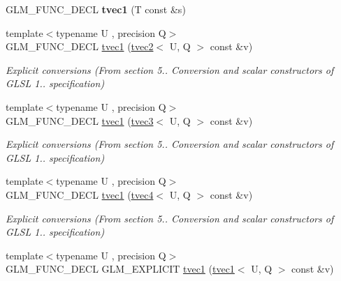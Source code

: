 \begin{DoxyCompactItemize}
\item 
\hypertarget{structglm_1_1tvec1_a601c1ad94434ad4f07eb536e66bd1143}{G\-L\-M\-\_\-\-F\-U\-N\-C\-\_\-\-D\-E\-C\-L {\bfseries tvec1} (T const \&s)}\label{structglm_1_1tvec1_a601c1ad94434ad4f07eb536e66bd1143}

\item 
\hypertarget{structglm_1_1tvec1_a8851910a8c3a76c5af513069af86c5f9}{{\footnotesize template$<$typename U , precision Q$>$ }\\G\-L\-M\-\_\-\-F\-U\-N\-C\-\_\-\-D\-E\-C\-L \hyperlink{structglm_1_1tvec1_a8851910a8c3a76c5af513069af86c5f9}{tvec1} (\hyperlink{structglm_1_1tvec2}{tvec2}$<$ U, Q $>$ const \&v)}\label{structglm_1_1tvec1_a8851910a8c3a76c5af513069af86c5f9}

\begin{DoxyCompactList}\small\item\em Explicit conversions (From section 5.. Conversion and scalar constructors of G\-L\-S\-L 1.. specification) \end{DoxyCompactList}\item 
\hypertarget{structglm_1_1tvec1_a680bd254cdc4777fc964b2bc96be2429}{{\footnotesize template$<$typename U , precision Q$>$ }\\G\-L\-M\-\_\-\-F\-U\-N\-C\-\_\-\-D\-E\-C\-L \hyperlink{structglm_1_1tvec1_a680bd254cdc4777fc964b2bc96be2429}{tvec1} (\hyperlink{structglm_1_1tvec3}{tvec3}$<$ U, Q $>$ const \&v)}\label{structglm_1_1tvec1_a680bd254cdc4777fc964b2bc96be2429}

\begin{DoxyCompactList}\small\item\em Explicit conversions (From section 5.. Conversion and scalar constructors of G\-L\-S\-L 1.. specification) \end{DoxyCompactList}\item 
\hypertarget{structglm_1_1tvec1_ab987fb10b4d96f02fe57a8f27fe009b3}{{\footnotesize template$<$typename U , precision Q$>$ }\\G\-L\-M\-\_\-\-F\-U\-N\-C\-\_\-\-D\-E\-C\-L \hyperlink{structglm_1_1tvec1_ab987fb10b4d96f02fe57a8f27fe009b3}{tvec1} (\hyperlink{structglm_1_1tvec4}{tvec4}$<$ U, Q $>$ const \&v)}\label{structglm_1_1tvec1_ab987fb10b4d96f02fe57a8f27fe009b3}

\begin{DoxyCompactList}\small\item\em Explicit conversions (From section 5.. Conversion and scalar constructors of G\-L\-S\-L 1.. specification) \end{DoxyCompactList}\item 
\hypertarget{structglm_1_1tvec1_a91828fdb1181e3e95e990aaf23b2db46}{{\footnotesize template$<$typename U , precision Q$>$ }\\G\-L\-M\-\_\-\-F\-U\-N\-C\-\_\-\-D\-E\-C\-L G\-L\-M\-\_\-\-E\-X\-P\-L\-I\-C\-I\-T \hyperlink{structglm_1_1tvec1_a91828fdb1181e3e95e990aaf23b2db46}{tvec1} (\hyperlink{structglm_1_1tvec1}{tvec1}$<$ U, Q $>$ const \&v)}\label{structglm_1_1tvec1_a91828fdb1181e3e95e990aaf23b2db46}


\end{DoxyCompactItemize}
